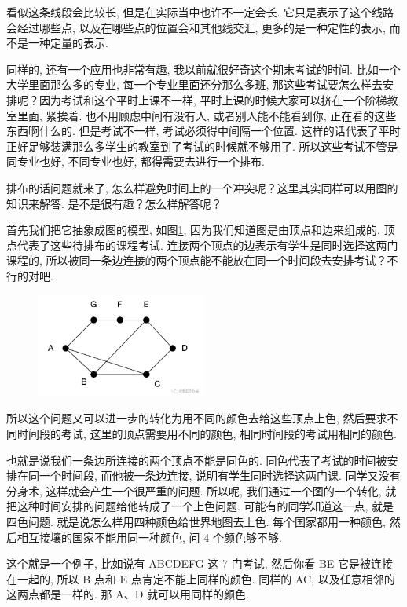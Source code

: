 看似这条线段会比较长, 但是在实际当中也许不一定会长. 它只是表示了这个线路会经过哪些点, 以及在哪些点的位置会和其他线交汇, 更多的是一种定性的表示, 而不是一种定量的表示. 

同样的, 还有一个应用也非常有趣, 我以前就很好奇这个期末考试的时间. 比如一个大学里面那么多的专业, 每一个专业里面还分那么多班, 那这些考试要怎么样去安排呢？因为考试和这个平时上课不一样, 平时上课的时候大家可以挤在一个阶梯教室里面, 紧挨着. 也不用顾虑中间有没有人, 或者别人能不能看到你, 正在看的这些东西啊什么的. 但是考试不一样, 考试必须得中间隔一个位置. 这样的话代表了平时正好足够装满那么多学生的教室到了考试的时候就不够用了. 所以这些考试不管是同专业也好, 不同专业也好, 都得需要去进行一个排布. 

排布的话问题就来了, 怎么样避免时间上的一个冲突呢？这里其实同样可以用图的知识来解答. 是不是很有趣？怎么样解答呢？

首先我们把它抽象成图的模型, 如图\ref{fig:img24_5}, 因为我们知道图是由顶点和边来组成的, 顶点代表了这些待排布的课程考试. 连接两个顶点的边表示有学生是同时选择这两门课程的, 所以被同一条边连接的两个顶点能不能放在同一个时间段去安排考试？不行的对吧. 

\begin{figure}[ht]
  \centering
  \includegraphics[width=0.5\textwidth]{asset/20231227144844.png}
  \caption{}
  \label{fig:img24_5}
\end{figure}

所以这个问题又可以进一步的转化为用不同的颜色去给这些顶点上色, 然后要求不同时间段的考试, 这里的顶点需要用不同的颜色, 相同时间段的考试用相同的颜色. 

也就是说我们一条边所连接的两个顶点不能是同色的. 同色代表了考试的时间被安排在同一个时间段, 而他被一条边连接, 说明有学生同时选择这两门课. 同学又没有分身术, 这样就会产生一个很严重的问题. 所以呢, 我们通过一个图的一个转化, 就把这种时间安排的问题给他转成了一个上色问题. 可能有的同学知道这一点, 就是四色问题. 就是说怎么样用四种颜色给世界地图去上色. 每个国家都用一种颜色, 然后相互接壤的国家不能用同一种颜色, 问 4 个颜色够不够. 

这个就是一个例子, 比如说有 ABCDEFG 这 7 门考试, 然后你看 BE 它是被连接在一起的, 所以 B 点和 E 点肯定不能上同样的颜色. 同样的 AC, 以及任意相邻的这两点都是一样的. 那 A、D 就可以用同样的颜色. 

